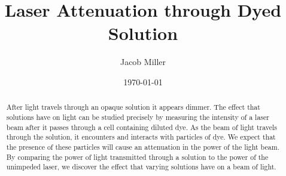 \documentclass[aps,prl,reprint,groupedaddress,amsmath,amssymb,aps]{revtex4-1}
\begin{document}
	
	
	
	\title{Laser Attenuation through Dyed Solution}
	
	
	\author{Jacob Miller}
	
	
	\date{\today}
	
	\begin{abstract}
	After light travels through an opaque solution it appears dimmer. The effect that solutions have on light can be studied precisely by measuring the intensity of a laser beam after it passes through a cell containing diluted dye. As the beam of light travels through the solution, it encounters and interacts with particles of dye. We expect that the presence of these particles will cause an attenuation in the power of the light beam. By comparing the power of light transmitted through a solution to the power of the unimpeded laser, we discover the effect that varying solutions have on a beam of light.
	\end{abstract}
	
	\pacs{}
	
\end{document}

